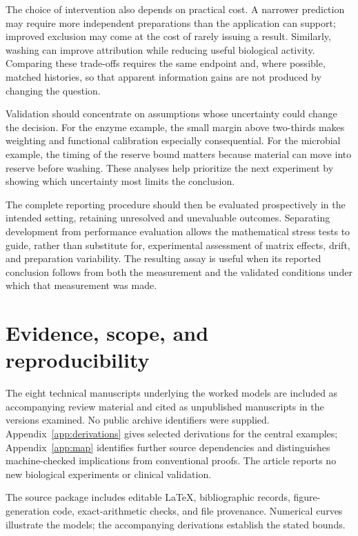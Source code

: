 \documentclass[11pt]{article}
\begin{document}
The choice of intervention also depends on practical cost. A narrower prediction may require more independent preparations than the application can support; improved exclusion may come at the cost of rarely issuing a result. Similarly, washing can improve attribution while reducing useful biological activity. Comparing these trade-offs requires the same endpoint and, where possible, matched histories, so that apparent information gains are not produced by changing the question.

Validation should concentrate on assumptions whose uncertainty could change the decision. For the enzyme example, the small margin above two-thirds makes weighting and functional calibration especially consequential. For the microbial example, the timing of the reserve bound matters because material can move into reserve before washing. These analyses help prioritize the next experiment by showing which uncertainty most limits the conclusion.

The complete reporting procedure should then be evaluated prospectively in the intended setting, retaining unresolved and unevaluable outcomes. Separating development from performance evaluation allows the mathematical stress tests to guide, rather than substitute for, experimental assessment of matrix effects, drift, and preparation variability. The resulting assay is useful when its reported conclusion follows from both the measurement and the validated conditions under which that measurement was made.

\section*{Evidence, scope, and reproducibility}
The eight technical manuscripts underlying the worked models are included as accompanying review material and cited as unpublished manuscripts in the versions examined. No public archive identifiers were supplied. Appendix~\ref{app:derivations} gives selected derivations for the central examples; Appendix~\ref{app:map} identifies further source dependencies and distinguishes machine-checked implications from conventional proofs. The article reports no new biological experiments or clinical validation.

The source package includes editable \LaTeX, bibliographic records, figure-generation code, exact-arithmetic checks, and file provenance. Numerical curves illustrate the models; the accompanying derivations establish the stated bounds.

\FloatBarrier
\appendix



\end{document}
